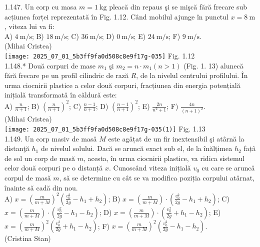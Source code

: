1.147. Un corp cu masa $m=1 \mathrm{~kg}$ pleacă din repaus şi se mişcă fără frecare sub acțiunea forței reprezentată în Fig. 1.12. Când mobilul ajunge în punctul $x=8 \mathrm{~m}$, viteza lui va fi:\\ A) $4 \mathrm{~m} / \mathrm{s}$; B) $18 \mathrm{~m} / \mathrm{s}$; C) $36 \mathrm{~m} / \mathrm{s}$; D) $0 \mathrm{~m} / \mathrm{s}$; E) $24 \mathrm{~m} / \mathrm{s}$; F) $9 \mathrm{~m} / \mathrm{s}$.\\ (Mihai Cristea)\\ \texttt{[image: 2025\_07\_01\_5b3ff9fa0d508c8e9f17g-035]} Fig. 1.12\\

1.148.* Două corpuri de mase $m_{1}$ şi $m_{2}=n \cdot m_{1}(n>1)$ (Fig. 1. 13) alunecă fără frecare pe un profil cilindric de rază $R$, de la nivelul centrului profilului. În urma ciocnirii plastice a celor două corpuri, fracțiunea din energia potențială inițială transformată în căldură este:\\ A) $\frac{n}{n+1}$; B) $\left(\frac{n}{n+1}\right)^{2}$; C) $\frac{n-1}{n+1}$; D) $\left(\frac{n-1}{n+1}\right)^{2}$; E) $\frac{2 n}{n^{2}+1}$; F) $\frac{4 n}{(n+1)^{2}}$. \\ (Mihai Cristea)\\ \texttt{[image: 2025\_07\_01\_5b3ff9fa0d508c8e9f17g-035(1)]} Fig. 1.13\\

1.149. Un corp masiv de masă $M$ este agățat de un fir inextensibil şi atârnă la distanţă $h_{1}$ de nivelul solului. Dacă se aruncă exact sub el, de la înălțimea $h_{2}$ fațã de sol un corp de masă $m$, acesta, în urma ciocnirii plastice, va ridica sistemul celor două corpuri pe o distanță $x$. Cunoscând viteza inițială $v_{0}$ cu care se aruncă corpul de masă $m$, să se determine cu cât se va modifica poziția corpului atârnat, înainte să cadă din nou.\\ A) $x=\left(\frac{m}{m+M}\right)^{2}\left(\frac{v_{0}^{2}}{2 g}-h_{1}+h_{2}\right)$; B) $x=\left(\frac{m}{m+M}\right) \cdot\left(\frac{v_{0}^{2}}{2 g}-h_{1}+h_{2}\right)$; C) $x=\left(\frac{m}{m+M}\right) \cdot\left(\frac{v_{0}^{2}}{2 g}-h_{1}-h_{2}\right)$; D) $x=\left(\frac{m}{m+M}\right) \cdot\left(\frac{v_{0}^{2}}{2 g}+h_{1}-h_{2}\right)$; E) $x=\left(\frac{m}{m+M}\right)^{2}\left(\frac{v_{0}^{2}}{2 g}+h_{1}-h_{2}\right)$; F) $x=\left(\frac{m}{m+M}\right)^{2}\left(\frac{v_{0}^{2}}{2 g}-h_{1}-h_{2}\right)$.\\ (Cristina Stan)\\

